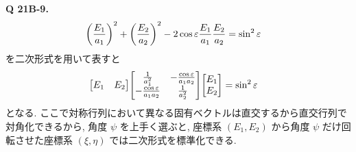 \documentclass[uplatex,dvipdfmx,a4paper,11pt]{jlreq}
\theoremstyle{definition}
\begin{document}
\textbf{Q 21B-9.}
\begin{align}
  \qty(\frac{E_1}{a_1})^2 + \qty(\frac{E_2}{a_2})^2 - 2\cos\varepsilon\frac{E_1}{a_1}\frac{E_2}{a_2} & = \sin^2{\varepsilon}
\end{align}
を二次形式を用いて表すと
\begin{align}
  \mqty[E_1 & E_2]\mqty[\frac{1}{a_1^2} & -\frac{\cos\varepsilon}{a_1a_2} \\ -\frac{\cos\varepsilon}{a_1a_2} & \frac{1}{a_2^2}]\mqty[E_1 \\ E_2] & = \sin^2\varepsilon
\end{align}
となる. ここで対称行列において異なる固有ベクトルは直交するから直交行列で対角化できるから, 角度 $\psi$ を上手く選ぶと, 座標系 $(E_1, E_2)$ から角度 $\psi$ だけ回転させた座標系 $(\xi, \eta)$ では二次形式を標準化できる.
\end{document}
